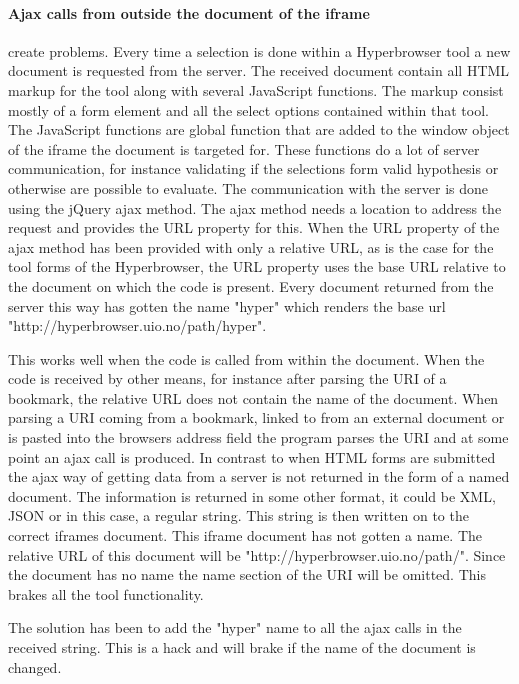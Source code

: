 \documentclass[english]{ifimaster}
\begin{document}
\paragraph{Ajax calls from outside the document of the iframe} create problems. Every time a selection is done within a Hyperbrowser tool a new document is requested from the server. The received document contain all HTML markup for the tool along with several JavaScript functions. The markup consist mostly of a form element and all the select options contained within that tool. The JavaScript functions are global function that are added to the window object of the iframe the document is targeted for. These functions do a lot of server communication, for instance validating if the selections form valid hypothesis or otherwise are possible to evaluate. The communication with the server is done using the jQuery ajax method. The ajax method needs a location to address the request and provides the URL property for this. When the URL property of the ajax method has been provided with only a relative URL, as is the case for the tool forms of the Hyperbrowser, the URL property uses the base URL relative to the document on which the code is present. Every document returned from the server this way has gotten the name "hyper" which renders the base url "http://hyperbrowser.uio.no/path/hyper". 

This works well when the code is called from within the document. When the code is received by other means, for instance after parsing the URI of a bookmark, the relative URL does not contain the name of the document. When parsing a URI coming from a bookmark, linked to from an external document or is pasted into the browsers address field the program parses the URI and at some point an ajax call is produced. In contrast to when HTML forms are submitted the ajax way of getting data from a server is not returned in the form of a named document. The information is returned in some other format, it could be XML, JSON or in this case, a regular string. This string is then written on to the correct iframes document. This iframe document has not gotten a name. The relative URL of this document will be "http://hyperbrowser.uio.no/path/". Since the document has no name the name section of the URI will be omitted. This brakes all the tool functionality.

The solution has been to add the "hyper" name to all the ajax calls in the received string. This is a hack and will brake if the name of the document is changed. 
\end{document}
